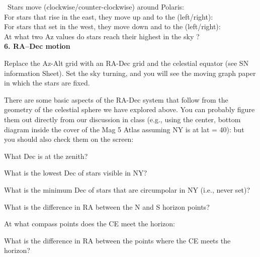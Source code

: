         \begin{figure*}[h]
        \centerline{}
        \caption{}
         \end{figure*}

\,
\bigskip
\noindent
Stars move (clockwise/counter-clockwise) around Polaris:\
\makebox[4cm]{\hrulefill}\\ 
For stars that rise in the east, they move up and to the
(left/right): \makebox[4cm]{\hrulefill}\\ 
For stars that set in the west, they move down and to the
(left/right): \makebox[4cm]{\hrulefill}\\ 
At what two Az values do  stars reach their highest in the sky ?\
\makebox[4cm]{\hrulefill} \\


\bigskip\noindent
{\bf 6. RA--Dec motion}

\medskip\noindent
Replace the Az-Alt grid with an RA-Dec grid and the celestial equator
(see SN information Sheet). Set the sky turning, and you will see the
moving graph paper in which the stars are fixed.

\noindent
There are some basic aspects of the RA-Dec system that follow from the
geometry of the celestial sphere we have explored above. You can
probably figure them out directly from our discussion in class (e.g.,
using the center, bottom diagram inside the cover of the Mag 5 Atlas
assuming NY is at lat = 40\deg): but
you should also check them on the screen: 

\bigskip
\noindent
What Dec is at the zenith?\  \makebox[4cm]{\hrulefill}

\noindent
What is the lowest Dec of stars visible in NY?  \makebox[4cm]{\hrulefill}

\noindent
What is the minimum Dec of stars that are circumpolar in NY (i.e.,
never set)? \makebox[3cm]{\hrulefill}

\noindent
What is the difference in RA between the N and S horizon
points? \makebox[4cm]{\hrulefill}

\noindent
At what compass points does the CE meet the horizon:\makebox[3cm]{\hrulefill}

\noindent
What is the difference in RA between the points where the CE meets the
horizon? \makebox[3cm]{\hrulefill}
